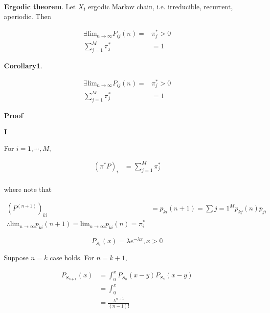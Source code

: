 \documentclass[12pt]{article}
\theoremstyle{nonumberbreak}
\begin{document}
\begin{theorem}
\textbf{Ergodic theorem}. Let $X_t$ ergodic Markov chain, i.e. irreducible, recurrent, aperiodic. Then

$$
\begin{aligned}
\exists \mathrm{lim}_{n\to\infty} P_{ij}(n) =& \pi_j^\ast > 0 \\[8pt]
\sum_{j=1}^M \pi_j^\ast &= 1
\end{aligned}
$$

\end{theorem}



\begin{theorem}
\textbf{Corollary1}.

$$
\begin{aligned}
\exists \mathrm{lim}_{n\to\infty} P_{ij}(n) =& \pi_j^\ast > 0 \\[8pt]
\sum_{j=1}^M \pi_j^\ast &= 1
\end{aligned}
$$

\end{theorem}



\textbf{Proof} 

\textbf{I}

For $i=1, \cdots, M$,


$$
\begin{aligned}
\left( \pi^\ast P \right)_i &= \sum_{j=1}^M \pi_j^\ast \\[8pt]
\end{aligned}
$$


where note that 

$$
\begin{aligned}
\left( P^{(n+1)} \right)_{ki} &= p_{ki} (n+1) = \sum{j=1}^M p_{kj} (n) p_{ji} \\[10pt]
\therefore \mathrm{lim}_{n \to \infty} p_{ki} (n+1) = \mathrm{lim}_{n \to \infty} p_{ki} (n) = \pi_i^\ast
\end{aligned}
$$



$$
P_{S_1} (x) = \lambda e^{-\lambda x}, x>0
$$

Suppose $n=k$ case holds. For $n=k+1$, 

$$
\begin{aligned}
P_{S_{n+1}}(x) &= \int_0^x P_{S_n} ( x-y)  P_{S_n} ( x-y) \\[8pt]
&= \int_0^x \frac{}{} \\[8pt]
&= \frac{\lambda^{n+1}}{(n-1)!} 
\end{aligned}
$$
\end{document}
